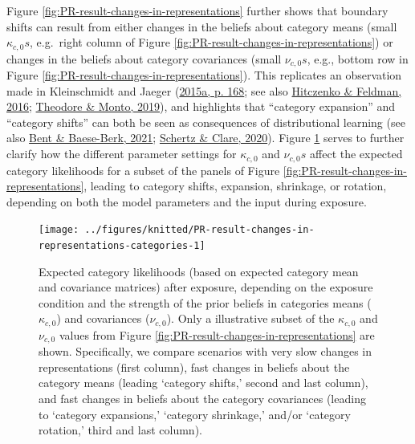 \documentclass[
  11pt,
  english,
  man,floatsintext]{apa6}
\begin{document}
Figure \ref{fig:PR-result-changes-in-representations} further shows that boundary shifts can result from either changes in the beliefs about category means (small \(\kappa_{c,0}s\), e.g.~right column of Figure \ref{fig:PR-result-changes-in-representations}) or changes in the beliefs about category covariances (small \(\nu_{c,0}s\), e.g., bottom row in Figure \ref{fig:PR-result-changes-in-representations}). This replicates an observation made in Kleinschmidt and Jaeger (\protect\hyperlink{ref-kleinschmidt-jaeger2015}{2015a, p. 168}; see also \protect\hyperlink{ref-hitczenko-feldman2016}{Hitczenko \& Feldman, 2016}; \protect\hyperlink{ref-theodore-monto2019}{Theodore \& Monto, 2019}), and highlights that ``category expansion'' and ``category shifts'' can both be seen as consequences of distributional learning (see also \protect\hyperlink{ref-bent-baeseberk2021}{Bent \& Baese-Berk, 2021}; \protect\hyperlink{ref-schertz-clare2020}{Schertz \& Clare, 2020}). Figure \ref{fig:PR-result-changes-in-representations-categories} serves to further clarify how the different parameter settings for \(\kappa_{c,0}\) and \(\nu_{c,0}s\) affect the expected category likelihoods for a subset of the panels of Figure \ref{fig:PR-result-changes-in-representations}, leading to category shifts, expansion, shrinkage, or rotation, depending on both the model parameters and the input during exposure.



\begin{figure}

{\centering \texttt{[image: ../figures/knitted/PR-result-changes-in-representations-categories-1]} 

}

\caption{Expected category likelihoods (based on expected category mean and covariance matrices) after exposure, depending on the exposure condition and the strength of the prior beliefs in categories means (\(\kappa_{c,0}\)) and covariances (\(\nu_{c,0}\)). Only a illustrative subset of the \(\kappa_{c,0}\) and \(\nu_{c,0}\) values from Figure \ref{fig:PR-result-changes-in-representations} are shown. Specifically, we compare scenarios with very slow changes in representations (first column), fast changes in beliefs about the category means (leading `category shifts,' second and last column), and fast changes in beliefs about the category covariances (leading to `category expansions,' `category shrinkage,' and/or `category rotation,' third and last column).}\label{fig:PR-result-changes-in-representations-categories}
\end{figure}
\end{document}
